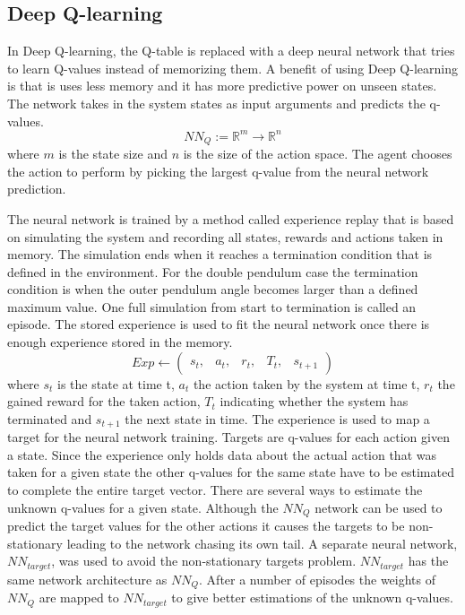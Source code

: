 \documentclass{LTHtwocol} %
\begin{document}
\subsection{Deep Q-learning}
In Deep Q-learning, the Q-table is replaced with a deep neural network that tries to learn Q-values instead of memorizing them.
A benefit of using Deep Q-learning is that is uses less memory and it has more predictive power on unseen states.
The network takes in the system states as input arguments and predicts the q-values.
\begin{equation}
	\label{eqn:neural_network_mapping}
	NN_Q := \mathbb{R}^m \to \mathbb{R}^n
\end{equation}
where $m$ is the state size and $n$ is the size of the action space.
The agent chooses the action to perform by picking the largest q-value from the neural network prediction.

The neural network is trained by a method called experience replay that is based on simulating the system and recording all states, rewards and actions taken in memory.
The simulation ends when it reaches a termination condition that is defined in the environment.
For the double pendulum case the termination condition is when the outer pendulum angle becomes larger than a defined maximum value.
One full simulation from start to termination is called an episode.
The stored experience is used to fit the neural network once there is enough experience stored in the memory.
\begin{equation}
	Exp \leftarrow \begin{pmatrix}s_t, & a_t, & r_t, & T_t, & s_{t+1}	\end{pmatrix}
\end{equation}
where $s_t$ is the state at time t, $a_t$ the action taken by the system at time t, $r_t$ the gained reward for the taken action, $T_t$ indicating whether the system has terminated and $s_{t+1}$ the next state in time.
The experience is used to map a target for the neural network training.
Targets are q-values for each action given a state.
Since the experience only holds data about the actual action that was taken for a given state the other q-values for the same state have to be estimated to complete the entire target vector.
There are several ways to estimate the unknown q-values for a given state.
Although the $NN_Q$ network can be used to predict the target values for the other actions it causes the targets to be non-stationary leading to the network chasing its own tail.
A separate neural network, $NN_{target}$, was used to avoid the non-stationary targets problem.
$NN_{target}$ has the same network architecture as $NN_Q$.
After a number of episodes the weights of $NN_Q$ are mapped to $NN_{target}$ to give better estimations of the unknown q-values.
\end{document}
